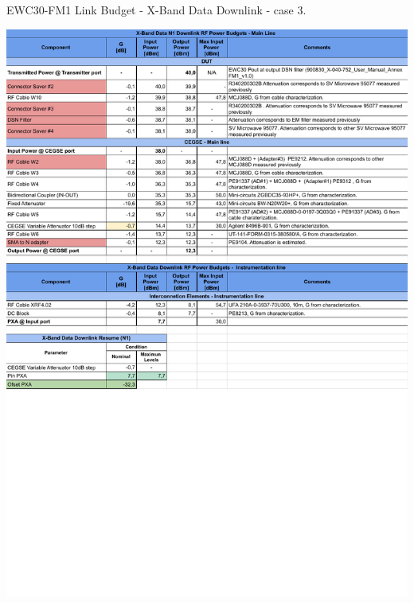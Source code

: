 \begin{table}[H]
	\centering
	\caption{EWC30-FM1 Link Budget - X-Band Data Downlink - case 3.} \label{tb:Data_DSNFM1}
	\includegraphics[page=1, scale=0.75, trim=0cm -0.3cm 0cm 0cm, clip ]
	{tables/Ensayos COMM-SS Link Budget -DSN X-Band Data N1 Downlink.pdf}\\
\end{table}

